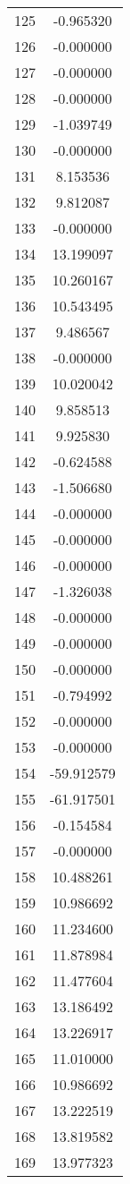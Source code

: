 \documentclass[12pt]{article}
\begin{document}
\begin{longtable}{@{}cc@{}}
125 & -0.965320 \\
126 & -0.000000 \\
127 & -0.000000 \\
128 & -0.000000 \\
129 & -1.039749 \\
130 & -0.000000 \\
131 & 8.153536 \\
132 & 9.812087 \\
133 & -0.000000 \\
134 & 13.199097 \\
135 & 10.260167 \\
136 & 10.543495 \\
137 & 9.486567 \\
138 & -0.000000 \\
139 & 10.020042 \\
140 & 9.858513 \\
141 & 9.925830 \\
142 & -0.624588 \\
143 & -1.506680 \\
144 & -0.000000 \\
145 & -0.000000 \\
146 & -0.000000 \\
147 & -1.326038 \\
148 & -0.000000 \\
149 & -0.000000 \\
150 & -0.000000 \\
151 & -0.794992 \\
152 & -0.000000 \\
153 & -0.000000 \\
154 & -59.912579 \\
155 & -61.917501 \\
156 & -0.154584 \\
157 & -0.000000 \\
158 & 10.488261 \\
159 & 10.986692 \\
160 & 11.234600 \\
161 & 11.878984 \\
162 & 11.477604 \\
163 & 13.186492 \\
164 & 13.226917 \\
165 & 11.010000 \\
166 & 10.986692 \\
167 & 13.222519 \\
168 & 13.819582 \\
169 & 13.977323 \\

\end{longtable}
\end{document}
